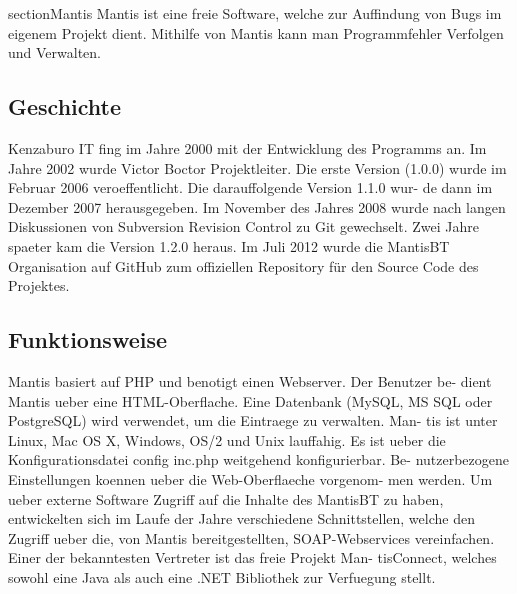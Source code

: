 section{Mantis}
Mantis ist eine freie Software, welche zur Auffindung von Bugs im eigenem
Projekt dient. Mithilfe von Mantis kann man Programmfehler Verfolgen und
Verwalten.
\subsection{Geschichte}
Kenzaburo IT fing im Jahre 2000 mit der Entwicklung des Programms an.
Im Jahre 2002 wurde Victor Boctor Projektleiter. Die erste Version (1.0.0)
wurde im Februar 2006 veroeffentlicht. Die darauffolgende Version 1.1.0 wur-
de dann im Dezember 2007 herausgegeben. Im November des Jahres 2008
wurde nach langen Diskussionen von Subversion Revision Control zu Git
gewechselt. Zwei Jahre spaeter kam die Version 1.2.0 heraus. Im Juli 2012
wurde die MantisBT Organisation auf GitHub zum offiziellen Repository
für den Source Code des Projektes.
\subsection{Funktionsweise}
Mantis basiert auf PHP und benotigt einen Webserver. Der Benutzer be-
dient Mantis ueber eine HTML-Oberflache. Eine Datenbank (MySQL, MS
SQL oder PostgreSQL) wird verwendet, um die Eintraege zu verwalten. Man-
tis ist unter Linux, Mac OS X, Windows, OS/2 und Unix lauffahig. Es ist
ueber die Konfigurationsdatei config inc.php weitgehend konfigurierbar. Be-
nutzerbezogene Einstellungen koennen ueber die Web-Oberflaeche vorgenom-
men werden. Um ueber externe Software Zugriff auf die Inhalte des MantisBT
zu haben, entwickelten sich im Laufe der Jahre verschiedene Schnittstellen,
welche den Zugriff ueber die, von Mantis bereitgestellten, SOAP-Webservices
vereinfachen. Einer der bekanntesten Vertreter ist das freie Projekt Man-
tisConnect, welches sowohl eine Java als auch eine .NET Bibliothek zur
Verfuegung stellt.

